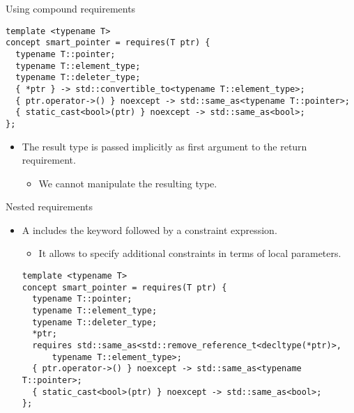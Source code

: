 \begin{frame}[t,fragile]{Using compound requirements}
\begin{lstlisting}
template <typename T>
concept smart_pointer = requires(T ptr) {
  typename T::pointer;
  typename T::element_type;
  typename T::deleter_type;
  { *ptr } -> std::convertible_to<typename T::element_type>;
  { ptr.operator->() } noexcept -> std::same_as<typename T::pointer>;
  { static_cast<bool>(ptr) } noexcept -> std::same_as<bool>;
};
\end{lstlisting}

\begin{itemize}
  \item The result type is passed implicitly as first argument
        to the return requirement.
    \begin{itemize}
      \item We cannot manipulate the resulting type.
    \end{itemize}
\end{itemize}

\end{frame}

\begin{frame}[t,fragile]{Nested requirements}
\begin{itemize}
  \item A  includes the 
        keyword followed by a constraint expression.
    \begin{itemize}
      \item It allows to specify additional constraints in terms
            of local parameters.
    \end{itemize}

\begin{lstlisting}
template <typename T>
concept smart_pointer = requires(T ptr) {
  typename T::pointer;
  typename T::element_type;
  typename T::deleter_type;
  *ptr;
  requires std::same_as<std::remove_reference_t<decltype(*ptr)>,
      typename T::element_type>;
  { ptr.operator->() } noexcept -> std::same_as<typename T::pointer>;
  { static_cast<bool>(ptr) } noexcept -> std::same_as<bool>;
};
\end{lstlisting}
\end{itemize}
\end{frame}

